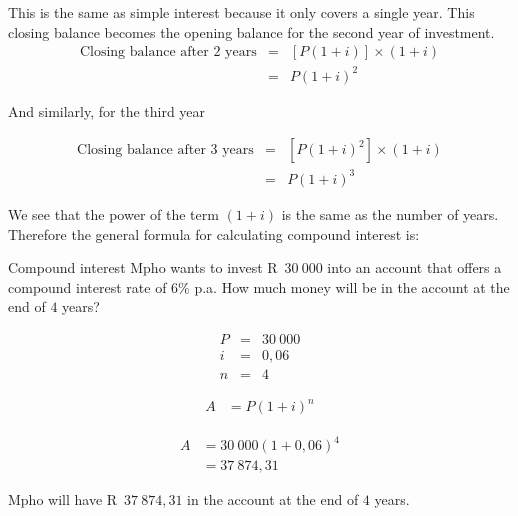 This is the same as simple interest because it only covers a single year. This closing balance becomes the opening balance for the second year of investment. 
\begin{eqnarray*}
    \mbox{Closing balance after $2$ years} &=& [P(1 + i)] \times (1 + i)\\
    &=& P(1 + i)^2
\end{eqnarray*}

And similarly, for the third year

\begin{eqnarray*}
    \mbox{Closing balance after $3$ years} &=& [P(1 + i)^2] \times (1 + i)\\
    &=& P(1 + i)^3
\end{eqnarray*}

We see that the power of the term $(1 + i)$ is the same as the number of years. Therefore the general formula for calculating compound interest is:



\begin{wex}{Compound interest}
{Mpho wants to invest R~$30~000$ into an account that offers a
  compound interest rate of $6\%$ p.a. How much money will be in the
  account at the end of $4$ years?}
{
    \begin{eqnarray*}
	P &=& 30~000\\
	i &=& 0,06\\
	n &=& 4
    \end{eqnarray*}

    \begin{align*}
	A &= P(1 + i)^n
    \end{align*}

    \begin{align*}
	A &= 30~000(1 + 0,06)^4\\
	  &= 37~874,31
    \end{align*}

    Mpho will have R~$37~874,31$ in the account at the end of $4$ years.
    }
\end{wex}


